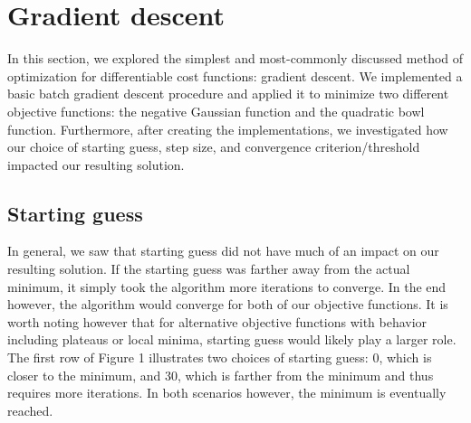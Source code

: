 \documentclass{article}
\begin{document}

\section{Gradient descent}

In this section, we explored the simplest and most-commonly discussed method of optimization for differentiable cost functions: gradient descent. We implemented a basic batch gradient descent procedure and applied it to minimize two different objective functions: the negative Gaussian function and the quadratic bowl function. Furthermore, after creating the implementations, we investigated how our choice of starting guess, step size, and convergence criterion/threshold impacted our resulting solution.

\subsection{Starting guess}
In general, we saw that starting guess did not have much of an impact on our resulting solution. If the starting guess was farther away from the actual minimum, it simply took the algorithm more iterations to converge. In the end however, the algorithm would converge for both of our objective functions. It is worth noting however that for alternative objective functions with behavior including plateaus or local minima, starting guess would likely play a larger role. The first row of Figure 1 illustrates two choices of starting guess: 0, which is closer to the minimum, and 30, which is farther from the minimum and thus requires more iterations. In both scenarios however, the minimum is eventually reached.
\end{document}

